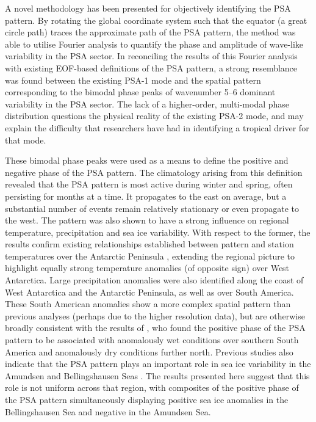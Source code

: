 A novel methodology has been presented for objectively identifying the PSA pattern. By rotating the global coordinate system such that the equator (a great circle path) traces the approximate path of the PSA pattern, the method was able to utilise Fourier analysis to quantify the phase and amplitude of wave-like variability in the PSA sector. In reconciling the results of this Fourier analysis with existing EOF-based definitions of the PSA pattern, a strong resemblance was found between the existing PSA-1 mode and the spatial pattern corresponding to the bimodal phase peaks of wavenumber 5--6 dominant variability in the PSA sector. The lack of a higher-order, multi-modal phase distribution questions the physical reality of the existing PSA-2 mode, and may explain the difficulty that researchers have had in identifying a tropical driver for that mode.     

These bimodal phase peaks were used as a means to define the positive and negative phase of the PSA pattern. The climatology arising from this definition revealed that the PSA pattern is most active during winter and spring, often persisting for months at a time. It propagates to the east on average, but a substantial number of events remain relatively stationary or even propagate to the west. The pattern was also shown to have a strong influence on regional temperature, precipitation and sea ice variability. With respect to the former, the results confirm existing relationships established between pattern and station temperatures over the Antarctic Peninsula \citep[e.g.][]{Schneider2012,Yu2012}, extending the regional picture to highlight equally strong temperature anomalies (of opposite sign) over West Antarctica. Large precipitation anomalies were also identified along the coast of West Antarctica and the Antarctic Peninsula, as well as over South America. These South American anomalies show a more complex spatial pattern than previous analyses (perhaps due to the higher resolution data), but are otherwise broadly consistent with the results of \citet{Mo2001}, who found the positive phase of the PSA pattern to be associated with anomalously wet conditions over southern South America and anomalously dry conditions further north. Previous studies also indicate that the PSA pattern plays an important role in sea ice variability in the Amundsen and Bellingshausen Seas \citep{Raphael2014}. The results presented here suggest that this role is not uniform across that region, with composites of the positive phase of the PSA pattern simultaneously displaying positive sea ice anomalies in the Bellingshausen Sea and negative in the Amundsen Sea.  


